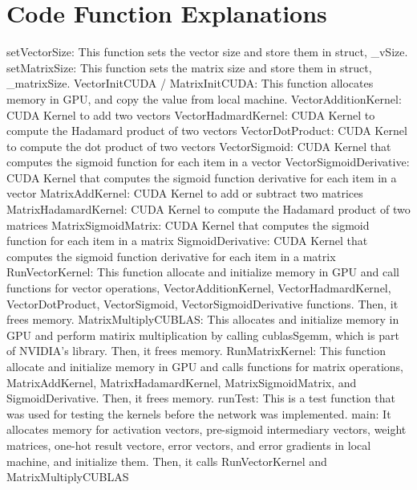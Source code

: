 \documentclass[11pt]{article}
\begin{document}
\section{Code Function Explanations}
\begin{outline}
	\setlength\itemsep{0em}
	\1 setVectorSize:
		\2 This function sets the vector size and store them in struct, \_vSize.
	\1 setMatrixSize:
		\2 This function sets the matrix size and store them in struct, \_matrixSize.
	\1 VectorInitCUDA / MatrixInitCUDA:
		\2 This function allocates memory in GPU, and copy the value from local machine.
	\1 VectorAdditionKernel:
		\2 CUDA Kernel to add two vectors
	\1 VectorHadmardKernel:
		\2 CUDA Kernel to compute the Hadamard product of two vectors
	\1 VectorDotProduct:
		\2 CUDA Kernel to compute the dot product of two vectors
	\1 VectorSigmoid:
		\2 CUDA Kernel that computes the sigmoid function for each item in a vector
	\1 VectorSigmoidDerivative:
		\2 CUDA Kernel that computes the sigmoid function derivative for each item in a vector
	\1 MatrixAddKernel:
		\2 CUDA Kernel to add or subtract two matrices
	\1 MatrixHadamardKernel:
		\2 CUDA Kernel to compute the Hadamard product of two matrices
	\1 MatrixSigmoidMatrix:
		\2 CUDA Kernel that computes the sigmoid function for each item in a matrix
	\1 SigmoidDerivative:
		\2 CUDA Kernel that computes the sigmoid function derivative for each item in a matrix
	\1 RunVectorKernel:
		\2 This function allocate and initialize memory in GPU and call functions for vector operations, VectorAdditionKernel, VectorHadmardKernel, VectorDotProduct, VectorSigmoid, VectorSigmoidDerivative functions. Then, it frees memory.
	\1 MatrixMultiplyCUBLAS:
		\2 This allocates and initialize memory in GPU and perform matirix multiplication by calling cublasSgemm, which is part of NVIDIA's library. Then, it frees memory.
	\1 RunMatrixKernel:
		\2 This function allocate and initialize memory in GPU and calls functions for matrix operations, MatrixAddKernel, MatrixHadamardKernel, MatrixSigmoidMatrix, and SigmoidDerivative. Then, it frees memory.
	\1 runTest:
		\2 This is a test function that was used for testing the kernels before the network was implemented. 
	\1 main: 
		\2 It allocates memory for activation vectors, pre-sigmoid intermediary vectors, weight matrices, one-hot result vectore, error vectors, and error gradients in local machine, and initialize them. Then, it calls RunVectorKernel and MatrixMultiplyCUBLAS

\end{outline}
\end{document}
